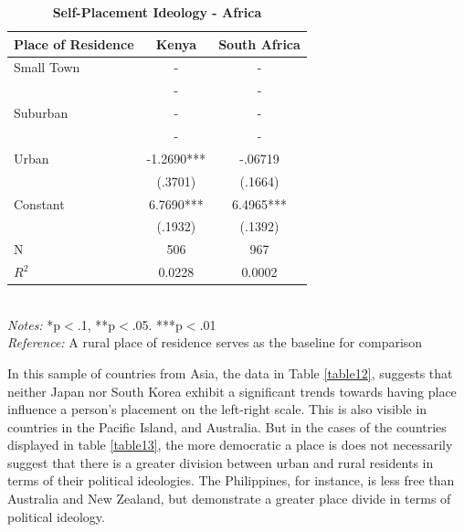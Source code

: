 \documentclass[12pt, titlepage]{article}
\newcommand\e{\emph}
\newcommand\tb{\textbf}
\begin{document}
\begin{table}[H]
	\centering
	\caption{\tb{Self-Placement Ideology - Africa}}
	\begin{tabulary}{\linewidth}{l c c}
		\\
		\hline
		\tb{Place of Residence} & \tb{Kenya}& \tb{South Africa} \\
		\hline
		Small Town&- &-\\
		&- & -\\
		Suburban&- & -\\
		& - &- \\
		Urban&-1.2690*** &-.06719 \\
		&(.3701)  &(.1664)\\
		Constant&6.7690*** &6.4965*** \\
		& (.1932) & (.1392) \\
		N&506 & 967\\
		$R^2$&0.0228 &0.0002 \\
		\hline
	\end{tabulary}
\\
\e{Notes:} *p$<$.1, **p$<$.05. ***p$<$.01 \\
\e{Reference:} A rural place of residence serves as the baseline for comparison
\label{table11}
\end{table}

In this sample of countries from Asia, the data in Table \ref{table12}, suggests that neither Japan nor South Korea exhibit a significant trends towards having place influence a person's placement on the left-right scale. This is also visible in countries in the Pacific Island, and Australia. But in the cases of the countries displayed in table \ref{table13}, the more democratic a place is does not necessarily suggest that there is a greater division between urban and rural residents in terms of their political ideologies. The Philippines, for instance, is less free than Australia and New Zealand, but demonstrate a greater place divide in terms of political ideology.
\end{document}
